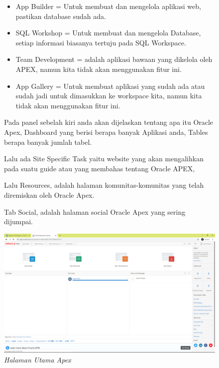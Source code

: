 \begin{itemize}
\begin{figure}[!htbp]
        \begin{itemize}
            \item App Builder = Untuk membuat dan mengelola aplikasi web, pastikan database sudah ada.
            \item SQL Workshop = Untuk membuat dan mengelola Database, setiap informasi biasanya tertuju pada SQL Workspace.
            \item  Team Development = adalah aplikasi bawaan yang dikelola oleh APEX, namun kita tidak akan menggunakan fitur ini.
            \item App Gallery = Untuk membuat aplikasi yang sudah ada atau sudah jadi untuk dimasukkan ke workspace kita, namun kita tidak akan menggunakan fitur ini.
        \end{itemize}
        \par Pada panel sebelah kiri anda akan dijelaskan tentang apa itu Oracle Apex, Dashboard yang berisi berapa banyak Aplikasi anda, Tables berapa banyak jumlah tabel.
        \par Lalu ada Site Specific Task yaitu website yang akan mengalihkan pada suatu guide atau yang membahas  tentang Oracle APEX,
        \par Lalu Resources, adalah halaman komunitas-komunitas yang telah diremiskan oleh Oracle Apex.
        \par Tab Social, adalah halaman social Oracle Apex yang sering dijumpai.
        \begin{center}
        \includegraphics[scale=0.23]{figures/12.png}
        \caption{\textit{Halaman Utama Apex}}
        \end{center}
        \end{figure}
\end{itemize}